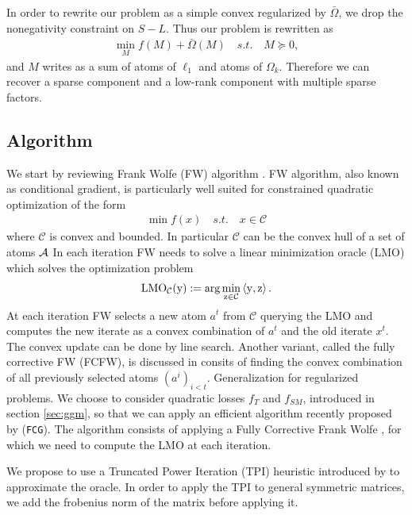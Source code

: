 In order to rewrite our problem as a simple convex regularized by $\bar{\Omega}$, we drop the nonegativity constraint on $S-L$. Thus our problem is rewritten as
\begin{align}
\label{opt_at}
\min_{M} f(M)+ \bar{\Omega}(M) \quad s.t. \quad M \succeq 0,
\end{align}
and $M$ writes as a sum of atoms of $\ell_1$ and atoms of $\Omega_k$. Therefore we can recover a sparse component and a low-rank component with multiple sparse factors.\\

\subsection{Algorithm}
We start by reviewing Frank Wolfe (FW) algorithm \citep{frank1956algorithm,LacosteFCFW}. 
FW algorithm, also known as conditional gradient, is particularly well suited for constrained quadratic optimization of the form
\begin{align*}
\min f(x) \quad s.t. \quad x\in \mathcal{C}
\end{align*}
where $\mathcal{C}$ is convex and bounded. In particular $\mathcal{C}$ can be the convex hull of a set of atoms $\mathcal{A}$  In each iteration FW needs to solve a linear minimization oracle (LMO) which solves the optimization problem
\begin{align}
\rm{{LMO}}_{\mathcal{C}}(y) := \arg\min_{z \in \mathcal{C}} \left\langle y,z \right\rangle.
\end{align}
At each iteration FW selects a new atom $a^t$ from $\mathcal{C}$ querying the LMO and computes the new iterate as a convex combination of $a^t$ and the old iterate $x^t$. The convex update can be done by line search. Another variant, called the fully corrective FW (FCFW), is discussed in \citet{LacosteFCFW} consits of finding the convex combination of all previously selected atoms $(a^i)_{i<t}$. 
 Generalization for regularized problems. We choose to consider quadratic losses $f_{T}$ and $f_{SM}$, introduced in section \ref{sec:ggm}, so that we can apply an efficient algorithm recently proposed by \citet{vinyes2017}(\texttt{FCG}). The algorithm consists of applying a Fully Corrective Frank Wolfe \citep{LacosteFCFW}, for which we need to compute the LMO at each iteration. 


We propose to use a Truncated Power Iteration (TPI) heuristic introduced by \citet{yuan2013truncated} to approximate the oracle. In order to apply the TPI to general symmetric matrices, we add the frobenius norm of the matrix before applying it. \\


